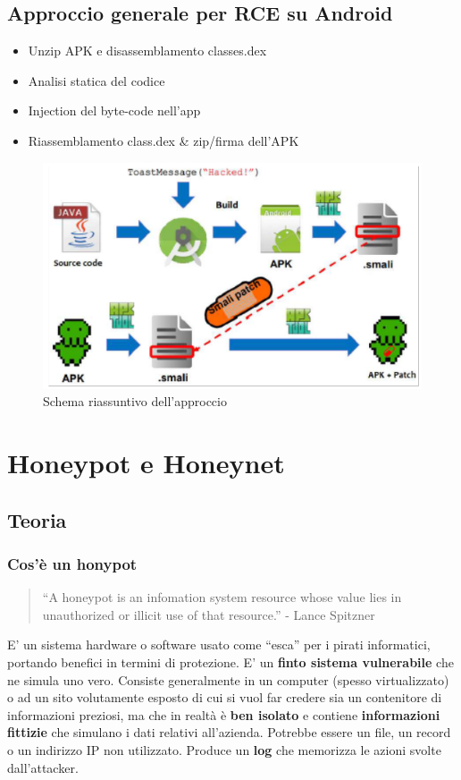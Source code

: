 \documentclass[8pt]{extarticle}
\begin{document}
\subsection{Approccio generale per RCE su Android}
\begin{itemize}
    \item Unzip APK e disassemblamento classes.dex
    \item Analisi statica del codice
    \item Injection del byte-code nell’app
    \item Riassemblamento class.dex \& zip/firma dell’APK
\end{itemize}
\begin{figure}[H]
    \center
    \includegraphics[scale=0.5]{images/RCE7.png}
    \caption{Schema riassuntivo dell'approccio}\label{fig:1}
\end{figure}
\section{Honeypot e Honeynet}
\subsection{Teoria}
\subsubsection{Cos'è un honypot}
\noindent
\begin{quotation}\small{}
“A honeypot is an infomation system resource whose value lies in unauthorized or illicit use of that resource.” 
- Lance Spitzner    
\end{quotation}
E’ un sistema hardware o software usato come “esca” per i pirati informatici, portando benefici 
in termini di protezione. E’ un \textbf{finto sistema vulnerabile} che ne simula uno vero. Consiste generalmente 
in un computer (spesso virtualizzato) o ad un sito volutamente esposto di cui si vuol far credere sia 
un contenitore di informazioni preziosi, ma che in realtà è \textbf{ben isolato} e contiene \textbf{informazioni fittizie} 
che simulano i dati relativi all’azienda. Potrebbe essere un file, un record o un indirizzo IP non utilizzato.
Produce un \textbf{log} che memorizza le azioni svolte dall’attacker.
\end{document}
